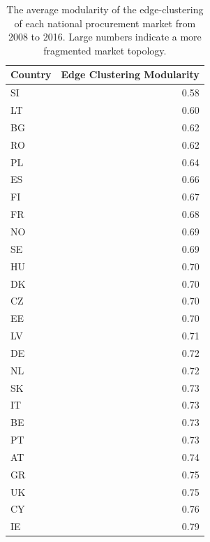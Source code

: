 \begin{table}
\begin{tabular}{lr}
\toprule
Country &  Edge Clustering Modularity \\
\midrule
SI      &           0.58 \\
LT      &           0.60 \\
BG      &           0.62 \\
RO      &           0.62 \\
PL      &           0.64 \\
ES      &           0.66 \\
FI      &           0.67 \\
FR      &           0.68 \\
NO      &           0.69 \\
SE      &           0.69 \\
HU      &           0.70 \\
DK      &           0.70 \\
CZ      &           0.70 \\
EE      &           0.70 \\
LV      &           0.71 \\
DE      &           0.72 \\
NL      &           0.72 \\
SK      &           0.73 \\
IT      &           0.73 \\
BE      &           0.73 \\
PT      &           0.73 \\
AT      &           0.74 \\
GR      &           0.75 \\
UK      &           0.75 \\
CY      &           0.76 \\
IE      &           0.79 \\
\bottomrule
\end{tabular}
\caption[Average National Procurement Market Edge-Clustered Modularity]{The average modularity of the edge-clustering of each national procurement market from 2008 to 2016. Large numbers indicate a more fragmented market topology.}
\label{tab:edge_modularities}
\end{table}


